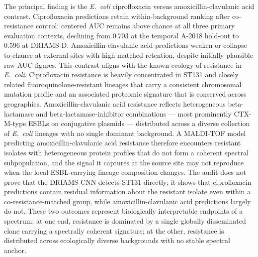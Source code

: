 \documentclass[11pt]{article}
\begin{document}
The principal finding is the \textit{E.~coli} ciprofloxacin versus amoxicillin-clavulanic acid contrast. Ciprofloxacin predictions retain within-background ranking after co-resistance control: centered AUC remains above chance at all three primary evaluation contexts, declining from 0.703 at the temporal A-2018 hold-out to 0.596 at DRIAMS-D. Amoxicillin-clavulanic acid predictions weaken or collapse to chance at external sites with high matched retention, despite initially plausible raw AUC figures. This contrast aligns with the known ecology of resistance in \textit{E.~coli}. Ciprofloxacin resistance is heavily concentrated in ST131 and closely related fluoroquinolone-resistant lineages that carry a consistent chromosomal mutation profile and an associated proteomic signature that is conserved across geographies\cite{nicolas2014st131}. Amoxicillin-clavulanic acid resistance reflects heterogeneous beta-lactamase and beta-lactamase-inhibitor combinations --- most prominently CTX-M-type ESBLs on conjugative plasmids --- distributed across a diverse collection of \textit{E.~coli} lineages with no single dominant background. A MALDI-TOF model predicting amoxicillin-clavulanic acid resistance therefore encounters resistant isolates with heterogeneous protein profiles that do not form a coherent spectral subpopulation, and the signal it captures at the source site may not reproduce when the local ESBL-carrying lineage composition changes. The audit does not prove that the DRIAMS CNN detects ST131 directly; it shows that ciprofloxacin predictions contain residual information about the resistant isolate even within a co-resistance-matched group, while amoxicillin-clavulanic acid predictions largely do not. These two outcomes represent biologically interpretable endpoints of a spectrum: at one end, resistance is dominated by a single globally disseminated clone carrying a spectrally coherent signature; at the other, resistance is distributed across ecologically diverse backgrounds with no stable spectral anchor.
\end{document}
